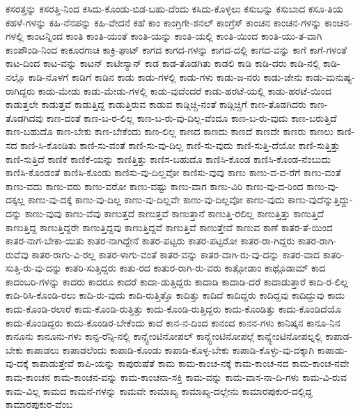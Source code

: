 {ಕಸರತ್ತನ್ನು
ಕಸರತ್ತಿ-ನಿಂದ
ಕಸಿದು-ಕೊಂಡು-ಬಿಡ-ಬಹು-ದೆಂದು
ಕಸಿದು-ಕೊಳ್ಳಲು
ಕಸುಬನ್ನು
ಕಸುಬಾದ
ಕಸೂ-ತಿಯ
ಕಹಳೆ-ಗಳನ್ನು
ಕಹಿ-ನೆನಪನ್ನು
ಕಹಿ-ವೇದನೆ
ಕಹೆ
ಕಾಂ
ಕಾಂಗ್ರಿಗೇ-ಶನಲ್
ಕಾಂಗ್ರೆಸ್
ಕಾಂಚನ
ಕಾಂಚನ-ಗಳನ್ನು
ಕಾಂಚನ-ಗಳಲ್ಲಿ
ಕಾಂಟನ್ನಿಂದ
ಕಾಂತಿ
ಕಾಂತಿ-ಯಂತೆ
ಕಾಂತಿ-ಯನ್ನು
ಕಾಂತಿ-ಯಲ್ಲಿ
ಕಾಂತಿ-ಯಿಂದ
ಕಾಂತಿ-ಯು-ತ-ವಾಗಿ
ಕಾಂಪೌಂಡಿ-ನಿಂದ
ಕಾಕೂರಗಾಚಿ
ಕಾಕ್ರಿ-ಘಾಟ್
ಕಾಗದ
ಕಾಗದ-ಗಳನ್ನು
ಕಾಗದ-ದಲ್ಲಿ
ಕಾಗದ-ವನ್ನು
ಕಾಗೆ
ಕಾಗೆ-ಗಳಂತೆ
ಕಾಟ-ದಿಂದ
ಕಾಟ-ವನ್ನು
ಕಾಟನ್
ಕಾಟೀಸ್ಯಾನ್
ಕಾಡ
ಕಾಡ-ತೊಡಗಿತು
ಕಾಡಲಿ
ಕಾಡಿ
ಕಾಡಿ-ದರು
ಕಾಡಿ-ನಲ್ಲಿ
ಕಾಡಿ-ನಲ್ಲೊ
ಕಾಡಿ-ನೊಳಗೆ
ಕಾಡಿಗೆ
ಕಾಡಿನ
ಕಾಡು
ಕಾಡು-ಗಳಲ್ಲಿ
ಕಾಡು-ಗಳು
ಕಾಡು-ಜ-ನರು
ಕಾಡು-ಜೇನು
ಕಾಡು-ಮನುಷ್ಯ-ರಾಗಿದ್ದರು
ಕಾಡು-ಮೇಡು
ಕಾಡು-ಮೇಡು-ಗಳಲ್ಲಿ
ಕಾಡು-ವುದೆಂದರೆ
ಕಾಡು-ಹರಟೆ-ಯಲ್ಲಿ
ಕಾಡು-ಹರಟೆ-ಯಿಂದ
ಕಾಡುತ್ತಲೇ
ಕಾಡುತ್ತವೆ
ಕಾಡುತ್ತಿದ್ದ
ಕಾಡುತ್ತಿರುವ
ಕಾಡುವ
ಕಾಡ್ಗಿಚ್ಚಿ-ನಂತೆ
ಕಾಡ್ಗಿಚ್ಚಿಗೆ
ಕಾಣ-ತೊಡಗಿದರು
ಕಾಣ-ತೊಡಗಿದವು
ಕಾಣ-ದಂತೆ
ಕಾಣ-ಬ-ರ-ಲಿಲ್ಲ
ಕಾಣ-ಬ-ರು-ವು-ದಿಲ್ಲ-ವೆಂದೂ
ಕಾಣ-ಬ-ರು-ವುದು
ಕಾಣ-ಬರುತ್ತಿದೆ
ಕಾಣ-ಬಹುದೊ
ಕಾಣ-ಬೇಕು
ಕಾಣ-ಬೇಕೆಂದು
ಕಾಣ-ಲಿಲ್ಲ
ಕಾಣದ
ಕಾಣದು
ಕಾಣದೆ
ಕಾಣದೇ
ಕಾಣರು
ಕಾಣಲು
ಕಾಣಿ-ಸದ
ಕಾಣಿ-ಸಿ-ಕೊಂಡಿತು
ಕಾಣಿ-ಸು-ವಂತೆ
ಕಾಣಿ-ಸು-ವು-ದಿಲ್ಲ
ಕಾಣಿ-ಸು-ವುದು
ಕಾಣಿ-ಸುತ್ತಿ-ದೆಯೋ
ಕಾಣಿ-ಸುತ್ತಿತ್ತು
ಕಾಣಿ-ಸುತ್ತಿದೆ
ಕಾಣಿಕೆ
ಕಾಣಿಕೆ-ಯನ್ನು
ಕಾಣಿತ್ತಿತ್ತು
ಕಾಣಿಸ-ಬಹುದೊ
ಕಾಣಿಸಿ-ಕೊಂಡ
ಕಾಣಿಸಿ-ಕೊಂಡ-ನೆಂಬುದು
ಕಾಣಿಸಿ-ಕೊಂಡಂತೆ
ಕಾಣಿಸಿ-ಕೊಂಡು
ಕಾಣಿಸು-ವು-ದಿಲ್ಲವೋ
ಕಾಣಿಸು-ವುವು
ಕಾಣು
ಕಾಣು-ವ-ವ-ರೆಗೆ
ಕಾಣು-ವಂತೆ
ಕಾಣು-ವದು
ಕಾಣು-ವರು
ಕಾಣು-ವರೋ
ಕಾಣು-ವಷ್ಟು
ಕಾಣು-ವಾಗ
ಕಾಣು-ವಿರಿ
ಕಾಣು-ವು-ದ-ರಿಂದ
ಕಾಣು-ವು-ದಕ್ಕಲ್ಲ
ಕಾಣು-ವು-ದಕ್ಕೆ
ಕಾಣು-ವು-ದಿಲ್ಲ
ಕಾಣು-ವು-ದಿಲ್ಲವೇ
ಕಾಣು-ವು-ದಿಲ್ಲವೋ
ಕಾಣು-ವುದು
ಕಾಣು-ವುದೆನ್ನುತ್ತಿದ್ದು-ದನ್ನು
ಕಾಣು-ವುವು
ಕಾಣು-ವೆವು
ಕಾಣುತ್ತದೆ
ಕಾಣುತ್ತವೆ
ಕಾಣುತ್ತಾನೆ
ಕಾಣುತ್ತಿ-ರಲಿಲ್ಲ
ಕಾಣುತ್ತಿತ್ತು
ಕಾಣುತ್ತಿದೆ
ಕಾಣುತ್ತಿದ್ದ
ಕಾಣುತ್ತಿದ್ದರೇ
ಕಾಣುತ್ತಿದ್ದವು
ಕಾಣುತ್ತಿದ್ದವೆ
ಕಾಣುತ್ತಿವೆ
ಕಾಣುತ್ತೇವೆ
ಕಾಣುವ
ಕಾಣೆ
ಕಾತರ-ತೆ-ಯಿಂದ
ಕಾತರ-ನಾಗ-ಬೇಕಾ-ಯಿತು
ಕಾತರ-ನಾಗಿದ್ದೇನೆ
ಕಾತರ-ಪಟ್ಟರು
ಕಾತರ-ಪಟ್ಟರೋ
ಕಾತರ-ರಾ-ಗಿದ್ದರು
ಕಾತರ-ರಾಗಿ-ರುವೆವು
ಕಾತರ-ರಾಗು-ವಿ-ರಲ್ಲ
ಕಾತರ-ಳಾಗು-ವಂತೆ
ಕಾತರ-ವನ್ನು
ಕಾತರ-ವಾಗಿ-ರು-ವು-ದನ್ನು
ಕಾತರ-ವಾದ
ಕಾತರಿ-ಸುತ್ತಿ-ರು-ವು-ದನ್ನು
ಕಾತರಿ-ಸುತ್ತಿದ್ದರು
ಕಾತು-ರದ
ಕಾತುರ-ರಾಗಿ-ರು-ವರು
ಕಾತ್ಗೋಡಾಂ
ಕಾಥ್ಗೊಡಾಮ್
ಕಾದ
ಕಾದಂಬರಿ-ಗಳನ್ನು
ಕಾದರು
ಕಾದರೂ
ಕಾದರೆ
ಕಾದಾ-ಡುತ್ತಿದ್ದರು
ಕಾದಾಡಿ
ಕಾದಾಡಿ-ದರೆ
ಕಾದಾಡುತ್ತಾರೆ
ಕಾದಿ-ರ-ಲಿಲ್ಲ
ಕಾದಿ-ರಿಸಿ-ಕೊಂಡಿ-ರಲು
ಕಾದಿ-ರು-ವುದು
ಕಾದಿ-ರುತ್ತಿತ್ತೊ
ಕಾದಿತ್ತು
ಕಾದಿದೆ
ಕಾದಿದ್ದರು
ಕಾದಿದ್ದವು
ಕಾದಿದ್ದುವು
ಕಾದು
ಕಾದು-ಕೊಂಡಿ-ರಲಾರೆ
ಕಾದು-ಕೊಂಡಿ-ರುತ್ತಿತ್ತು
ಕಾದು-ಕೊಂಡಿ-ರುತ್ತಿದ್ದರು
ಕಾದು-ಕೊಂಡಿತ್ತು
ಕಾದು-ಕೊಂಡಿದೆಯೊ
ಕಾದು-ಕೊಂಡಿದ್ದರು
ಕಾದು-ಕೊಂಡಿರ-ಬೇಕೆಂದು
ಕಾದೆ
ಕಾನ-ನ-ದಿಂದ
ಕಾನಂದ
ಕಾನನ-ಗಳು
ಕಾನಿಷ್ಕನ
ಕಾನೂ-ನಿನ
ಕಾನೂನು
ಕಾನೂನು-ಗಳು
ಕಾನ್ಫ-ರೆನ್ಸಿ-ನಲ್ಲಿ
ಕಾನ್ಸ್ಟೇಂಟಿನೋಪಲ್
ಕಾನ್ಸ್ಟೇಂಟಿನೋಪಲ್ಗೆ
ಕಾನ್ಸ್ಟೇಂಟಿನೋಪಲ್ನಲ್ಲಿ
ಕಾಪಾಡ-ಬೇಕು
ಕಾಪಾಡಲು
ಕಾಪಾಡಲೆಂದು
ಕಾಪಾಡಿ-ಕೊಂಡು
ಕಾಪಾಡಿ-ಕೊಳ್ಳ-ಬೇಕು
ಕಾಪಾಡಿ-ಕೊಳ್ಳು-ವು-ದಕ್ಕಾಗಿ
ಕಾಪಾಡು-ವು-ದಕ್ಕೆ
ಕಾಪಾಡುತ್ತೇವೆ
ಕಾಪಿ-ಯನ್ನು
ಕಾಪುರುಷೆತೆ
ಕಾಮ
ಕಾಮ-ಕಾಂಚ-ನಕ್ಕೆ
ಕಾಮ-ಕಾಂಚ-ನದ
ಕಾಮ-ಕಾಂಚ-ನವೇ
ಕಾಮ-ಕಾಂಚನ
ಕಾಮ-ಕಾಂಚನ-ವನ್ನು
ಕಾಮ-ಕಾಂಚನಾ-ಸಕ್ತಿ
ಕಾಮ-ವನ್ನು
ಕಾಮ-ವಾಸ-ನಾ-ದಿ-ಗಳು
ಕಾಮ-ವಿ-ರುವ
ಕಾಮ-ವಿಲ್ಲ
ಕಾಮದ
ಕಾಮನೆ-ಗಳನ್ನು
ಕಾಮವೇ
ಕಾಮಾಖ್ಯ
ಕಾಮಾಖ್ಯ-ದಲ್ಲೇನು
ಕಾಮಾರಪುಕುರ-ದಲ್ಲಿದ್ದ
ಕಾಮಾರಪುಕುರ-ವೆಂಬ
}
